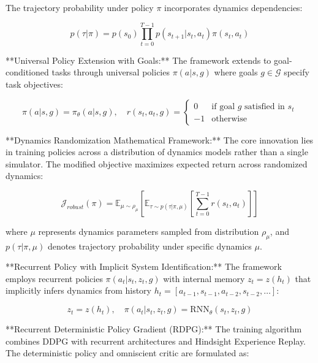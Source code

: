\documentclass[journal]{IEEEtran}
\begin{document}
{The trajectory probability under policy $\pi$ incorporates dynamics dependencies:

\begin{equation}
p(\tau|\pi) = p(s_0) \prod_{t=0}^{T-1} p(s_{t+1}|s_t, a_t) \pi(s_t, a_t)
\label{eq:peng_trajectory_probability}
\end{equation}

**Universal Policy Extension with Goals:**
The framework extends to goal-conditioned tasks through universal policies $\pi(a|s,g)$ where goals $g \in \mathcal{G}$ specify task objectives:

\begin{equation}
\pi(a|s,g) = \pi_\theta(a|s,g), \quad r(s_t, a_t, g) = \begin{cases}
0 & \text{if goal } g \text{ satisfied in } s_t \\
-1 & \text{otherwise}
\end{cases}
\label{eq:peng_universal_policy}
\end{equation}

**Dynamics Randomization Mathematical Framework:**
The core innovation lies in training policies across a distribution of dynamics models rather than a single simulator. The modified objective maximizes expected return across randomized dynamics:

\begin{equation}
\mathcal{J}_{robust}(\pi) = \mathbb{E}_{\mu \sim \rho_\mu} \left[ \mathbb{E}_{\tau \sim p(\tau|\pi,\mu)} \left[ \sum_{t=0}^{T-1} r(s_t, a_t) \right] \right]
\label{eq:peng_dynamics_randomization}
\end{equation}

where $\mu$ represents dynamics parameters sampled from distribution $\rho_\mu$, and $p(\tau|\pi,\mu)$ denotes trajectory probability under specific dynamics $\mu$.

**Recurrent Policy with Implicit System Identification:**
The framework employs recurrent policies $\pi(a_t|s_t, z_t, g)$ with internal memory $z_t = z(h_t)$ that implicitly infers dynamics from history $h_t = [a_{t-1}, s_{t-1}, a_{t-2}, s_{t-2}, \ldots]$:

\begin{equation}
z_t = z(h_t), \quad \pi(a_t|s_t, z_t, g) = \text{RNN}_\theta(s_t, z_t, g)
\label{eq:peng_recurrent_policy}
\end{equation}

**Recurrent Deterministic Policy Gradient (RDPG):**
The training algorithm combines DDPG with recurrent architectures and Hindsight Experience Replay. The deterministic policy and omniscient critic are formulated as:

}
\end{document}
